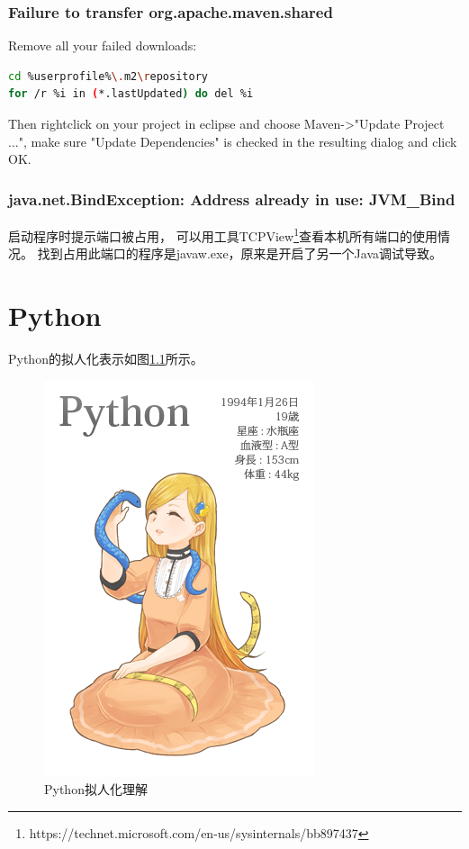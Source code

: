 \documentclass{book}
\begin{document}
\subsection{Failure to transfer org.apache.maven.shared}

Remove all your failed downloads:

\begin{lstlisting}[language=Bash]
cd %userprofile%\.m2\repository
for /r %i in (*.lastUpdated) do del %i
\end{lstlisting}

Then rightclick on your project in eclipse and choose Maven->"Update Project ...", 
make sure "Update Dependencies" is checked in the resulting dialog and click OK.

\subsection{java.net.BindException: Address already in use: JVM\_Bind}

启动程序时提示端口被占用，
可以用工具TCPView\footnote{https://technet.microsoft.com/en-us/sysinternals/bb897437}查看本机所有端口的使用情况。
找到占用此端口的程序是javaw.exe，原来是开启了另一个Java调试导致。

\chapter{Python}

Python的拟人化表示如图\ref{code:PythonVirtual}所示。

\begin{figure}[htbp]
	\centering
	\includegraphics[scale=0.6]{PythonVirtual.jpg}
	\caption{Python拟人化理解}
	\label{code:PythonVirtual}
\end{figure}
\end{document}
